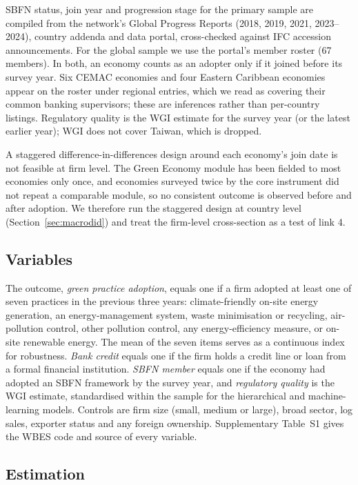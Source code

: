 \documentclass[review,authoryear,12pt]{elsarticle}
\begin{document}
SBFN status, join year and progression stage for the primary sample are compiled from the network's Global Progress Reports (2018, 2019, 2021, 2023--2024), country addenda and data portal, cross-checked against IFC accession announcements. For the global sample we use the portal's member roster (67 members). In both, an economy counts as an adopter only if it joined before its survey year. Six CEMAC economies and four Eastern Caribbean economies appear on the roster under regional entries, which we read as covering their common banking supervisors; these are inferences rather than per-country listings. Regulatory quality is the WGI estimate for the survey year (or the latest earlier year); WGI does not cover Taiwan, which is dropped.

A staggered difference-in-differences design around each economy's join date is not feasible at firm level. The Green Economy module has been fielded to most economies only once, and economies surveyed twice by the core instrument did not repeat a comparable module, so no consistent outcome is observed before and after adoption. We therefore run the staggered design at country level (Section~\ref{sec:macrodid}) and treat the firm-level cross-section as a test of link 4.

\subsection{Variables}

The outcome, \emph{green practice adoption}, equals one if a firm adopted at least one of seven practices in the previous three years: climate-friendly on-site energy generation, an energy-management system, waste minimisation or recycling, air-pollution control, other pollution control, any energy-efficiency measure, or on-site renewable energy. The mean of the seven items serves as a continuous index for robustness. \emph{Bank credit} equals one if the firm holds a credit line or loan from a formal financial institution. \emph{SBFN member} equals one if the economy had adopted an SBFN framework by the survey year, and \emph{regulatory quality} is the WGI estimate, standardised within the sample for the hierarchical and machine-learning models. Controls are firm size (small, medium or large), broad sector, log sales, exporter status and any foreign ownership. Supplementary Table~S1 gives the WBES code and source of every variable.

\subsection{Estimation}
\end{document}
